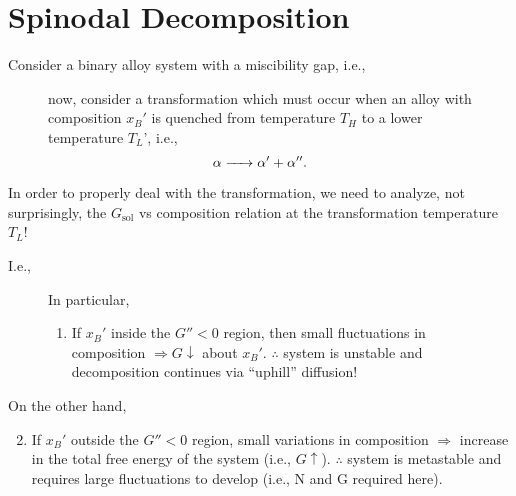 \documentclass[12pt]{article}
\begin{document}
\setcounter{section}{12}
\section{Spinodal Decomposition}

Consider a binary alloy system with a miscibility gap,
i.e.,
\begin{figure}[h]
	\begin{minipage}[l]{0.3\textwidth}
		
	\end{minipage}%
	\hfil
	\begin{minipage}[r]{0.6\textwidth}
		now, consider a transformation which must occur when an alloy
		with composition $x_B'$ is quenched from temperature $T_H$
		to a lower temperature $T_L$', i.e.,
		\begin{equation*}
			\ce{$\alpha$ -> $\alpha' + \alpha''$}.
		\end{equation*}
	\end{minipage}
\end{figure}

In order to properly deal with the transformation, we need to analyze,
not surprisingly, the $G_{\text{sol}}$ vs composition relation at the
transformation temperature $T_L$!

I.e.,
\begin{figure}[h]
	\begin{minipage}[l]{0.3\textwidth}
		
	\end{minipage}%
	\hfil
	\begin{minipage}[r]{0.6\textwidth}
		In particular,
		\begin{enumerate}
			\item If $x_B'$ inside the $G''<0$ region, then small fluctuations
			      in composition $\Rightarrow G \downarrow$ about $x_B'$.
			      $\therefore$ system is unstable and decomposition continues via
			      ``uphill'' diffusion!
		\end{enumerate}
	\end{minipage}
\end{figure}

On the other hand,
\begin{enumerate}
	\setcounter{enumi}{1}
	\item If $x_B'$ outside the $G''<0$ region,
	      small variations in composition $\Rightarrow$ increase in the total
	      free energy of the system (i.e., $G \uparrow$).
	      $\therefore$ system is metastable and requires large fluctuations to
	      develop  (i.e., N and G required here).
\end{enumerate}
\end{document}
